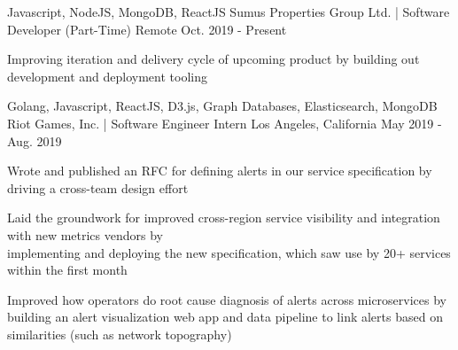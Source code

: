 

\begin{cventries}

  \cventry
    {Javascript, NodeJS, MongoDB, ReactJS} %
    {Sumus Properties Group Ltd. | Software Developer (Part-Time)} %
    {Remote} %
    {Oct. 2019 - Present} %
    {
      \begin{cvitems} %
        \item {Improving iteration and delivery cycle of upcoming product by building out development and deployment tooling}
      \end{cvitems}
    }

  \cventry
    {Golang, Javascript, ReactJS, D3.js, Graph Databases, Elasticsearch, MongoDB} %
    {Riot Games, Inc. | Software Engineer Intern} %
    {Los Angeles, California} %
    {May 2019 - Aug. 2019} %
    {
      \begin{cvitems} %
        \item {Wrote and published an RFC for defining alerts in our service specification by driving a cross-team design effort}
        \item{Laid the groundwork for improved cross-region service visibility and integration with new metrics vendors by \\implementing and deploying the new specification, which saw use by 20+ services within the first month}
        \item {Improved how operators do root cause diagnosis of alerts across microservices by building an alert visualization web app and data pipeline to link alerts based on similarities (such as network topography)}
      \end{cvitems}
    }


\end{cventries}
